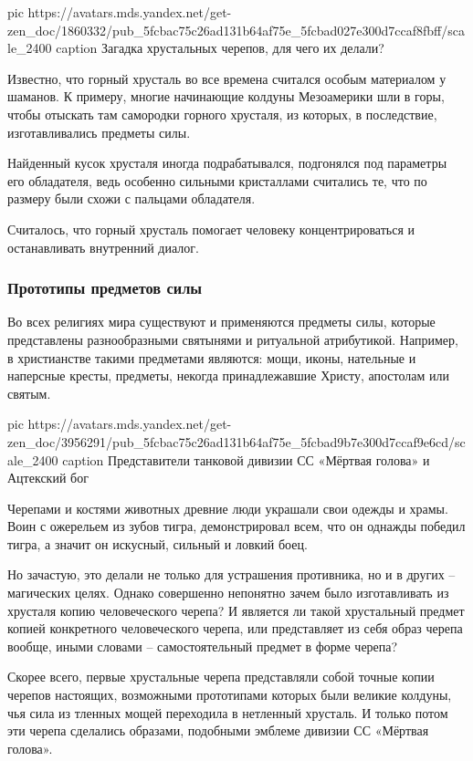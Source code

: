 \ifcmt
  pic https://avatars.mds.yandex.net/get-zen_doc/1860332/pub_5fcbac75c26ad131b64af75e_5fcbad027e300d7ccaf8fbff/scale_2400
  caption Загадка хрустальных черепов, для чего их делали?
\fi

Известно, что горный хрусталь во все времена считался особым материалом у
шаманов. К примеру, многие начинающие колдуны Мезоамерики шли в горы, чтобы
отыскать там самородки горного хрусталя, из которых, в последствие,
изготавливались предметы силы.

Найденный кусок хрусталя иногда подрабатывался, подгонялся под параметры его
обладателя, ведь особенно сильными кристаллами считались те, что по размеру
были схожи с пальцами обладателя.

Считалось, что горный хрусталь помогает человеку концентрироваться и
останавливать внутренний диалог.

\subsubsection{Прототипы предметов силы}

Во всех религиях мира существуют и применяются предметы силы, которые
представлены разнообразными святынями и ритуальной атрибутикой. Например, в
христианстве такими предметами являются: мощи, иконы, нательные и наперсные
кресты, предметы, некогда принадлежавшие Христу, апостолам или святым.

\ifcmt
  pic https://avatars.mds.yandex.net/get-zen_doc/3956291/pub_5fcbac75c26ad131b64af75e_5fcbad9b7e300d7ccaf9e6cd/scale_2400
  caption Представители танковой дивизии СС «Мёртвая голова» и Ацтекский бог
\fi

Черепами и костями животных древние люди украшали свои одежды и храмы. Воин с
ожерельем из зубов тигра, демонстрировал всем, что он однажды победил тигра, а
значит он искусный, сильный и ловкий боец.

Но зачастую, это делали не только для устрашения противника, но и в других –
магических целях. Однако совершенно непонятно зачем было изготавливать из
хрусталя копию человеческого черепа? И является ли такой хрустальный предмет
копией конкретного человеческого черепа, или представляет из себя образ черепа
вообще, иными словами – самостоятельный предмет в форме черепа?

Скорее всего, первые хрустальные черепа представляли собой точные копии черепов
настоящих, возможными прототипами которых были великие колдуны, чья сила из
тленных мощей переходила в нетленный хрусталь. И только потом эти черепа
сделались образами, подобными эмблеме дивизии СС «Мёртвая голова».

